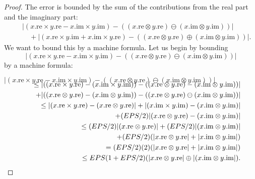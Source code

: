 \begin{proof}{}
The error is bounded by the sum of the contributions from the real part and the imaginary part:
\begin{eqnarray*}
&&|(x.\mathrm {re} \times  y.\mathrm {re} - x.\mathrm {im} \times y.\mathrm {im}) - ((x.\mathrm {re} \otimes y.\mathrm {re}) \ominus
(x.\mathrm {im}
\otimes y.\mathrm {im}))| \\[6pt]
&&\quad + |(x.\mathrm {re} \times  y.\mathrm {im} + x.\mathrm {im} \times y.\mathrm {re}) - ((x.\mathrm {re} \otimes y.\mathrm {re}) \oplus (x.\mathrm {im}
\otimes y.\mathrm {im}))|.
\end{eqnarray*}
   We want to bound this by a machine formula.  Let us begin by bounding 
$$|(x.\mathrm {re} \times  y.\mathrm {re} - x.\mathrm {im} \times y.\mathrm {im}) - ((x.\mathrm {re} \otimes y.\mathrm {re}) \ominus (x.\mathrm {im}
 \otimes y.\mathrm {im}))| $$ 
by a machine formula:

\centerline{
${\displaystyle |(x.\mathrm {re} \times  y.\mathrm {re} - x.\mathrm {im} \times y.\mathrm {im}) - ((x.\mathrm {re} \otimes y.\mathrm {re}) \ominus
(x.\mathrm {im}
\otimes y.\mathrm {im}))| }$}
\begin{eqnarray*}
\noalign{\vskip-16pt}
&&\le |((x.\mathrm {re} \times  y.\mathrm {re}) - (x.\mathrm {im} \times y.\mathrm {im})) - ((x.\mathrm {re} \otimes y.\mathrm {re}) -
(x.\mathrm {im}
\otimes y.\mathrm {im}))|\\
&&\quad + |((x.\mathrm {re} \otimes y.\mathrm {re}) - (x.\mathrm {im} \otimes y.\mathrm {im}))-((x.\mathrm {re} \otimes y.\mathrm {re})
\ominus (x.\mathrm {im} \otimes y.\mathrm {im}))| \\
&&\le |(x.\mathrm {re} \times  y.\mathrm {re}) - (x.\mathrm {re} \otimes y.\mathrm {re})| + |(x.\mathrm {im} \times y.\mathrm {im})- (x.\mathrm {im} \otimes y.\mathrm {im})| \\
&&\quad + (EPS/2)|(x.\mathrm {re} \otimes y.\mathrm {re}) - (x.\mathrm {im} \otimes
y.\mathrm {im})|\\
&&\le (EPS/2)|(x.\mathrm {re} \otimes y.\mathrm {re})| + (EPS/2)|(x.\mathrm {im} \otimes y.\mathrm {im})| \\
&&\quad + (EPS/2)(|x.\mathrm {re} \otimes
y.\mathrm {re}| + |x.\mathrm {im} \otimes y.\mathrm {im}|)\\
&&= (EPS/2)(2) (|x.\mathrm {re} \otimes y.\mathrm {re}| + |x.\mathrm {im} \otimes y.\mathrm {im}|)\\
&&\le EPS (1 + EPS/2) (|x.\mathrm {re} \otimes y.\mathrm {re}| \oplus |(x.\mathrm {im} \otimes y.\mathrm {im}|) .
\end{eqnarray*}



\end{proof}
